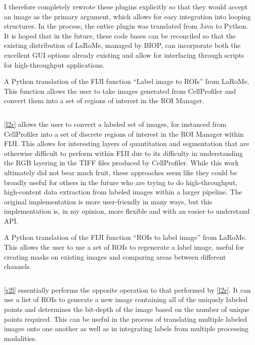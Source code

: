 I therefore completely rewrote these plugins explicitly so that they would accept an image as the primary argument, which allows for easy integration into looping structures. In the process, the entire plugin was translated from Java to Python. It is hoped that in the future, these code bases can be reconciled so that the existing distribution of LaRoMe, managed by BIOP, can incorporate both the excellent GUI options already existing and allow for interfacing through scripts for high-throughput applications.

\begin{code}
\caption{A Python translation of the FIJI function ``Label image to ROIs'' from LaRoMe. This function allows the user to take images generated from CellProfiler and convert them into a set of regions of interest in the ROI Manager.}
\label{l2r}

\inputminted[breaklines,frame=single,fontsize=\small]{python}{source/labelsToROIs.py}

\end{code}

\autoref{l2r} allows the user to convert a labeled set of images, for instanced from CellProfiler \citep{Carpenter2006, Kamentsky2011, Stirling2021, McQuin2018} into a set of discrete regions of interest in the ROI Manager within FIJI. This allows for interesting layers of quantitation and segmentation that are otherwise difficult to perform within FIJI due to its difficulty in understanding the RGB layering in the TIFF files produced by CellProfiler. While this work ultimately did not bear much fruit, these approaches seem like they could be broadly useful for others in the future who are trying to do high-throughput, high-content data extraction from labeled images within a larger pipeline. The original implementation is more user-friendly in many ways, but this implementation is, in my opinion, more flexible and with an easier to understand API.

\begin{code}
\caption{A Python translation of the FIJI function ``ROIs to label image'' from LaRoMe. This allows the user to use a set of ROIs to regenerate a label image, useful for creating masks on existing images and comparing areas between different channels.}
\label{r2l}

\inputminted[breaklines,frame=single,fontsize=\small]{python}{source/ROIsTolabels.py}

\end{code}

\autoref{r2l} essentially performs the opposite operation to that performed by \autoref{l2r}. It can use a list of ROIs to generate a new image containing all of the uniquely labeled points and determines the bit-depth of the image based on the number of unique points required. This can be useful in the process of translating multiple labeled images onto one another as well as in integrating labels from multiple processing modalities.

